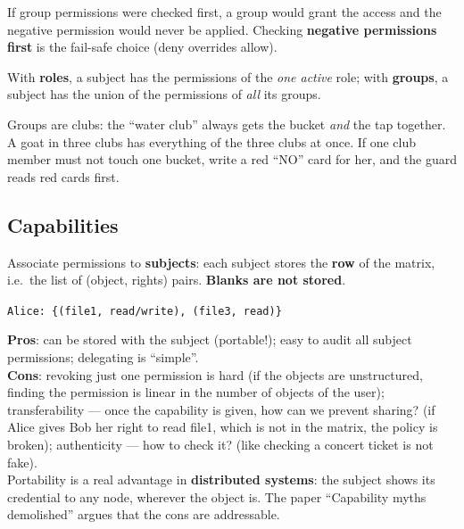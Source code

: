 \begin{propbox}[title=Negative permissions are checked first]
If group permissions were checked first, a group would grant the access and the
negative permission would never be applied. Checking \textbf{negative permissions first}
is the fail-safe choice (deny overrides allow).
\end{propbox}

\begin{rembox}[title=RBAC vs.\ groups]
With \textbf{roles}, a subject has the permissions of the \emph{one active} role; with
\textbf{groups}, a subject has the union of the permissions of \emph{all} its groups.
\end{rembox}

\begin{goatbox}
Groups are clubs: the ``water club'' always gets the bucket \emph{and} the tap together. A goat in
three clubs has everything of the three clubs at once. If one club member must not touch one
bucket, write a red ``NO'' card for her, and the guard reads red cards first.
\end{goatbox}

\subsection{Capabilities}

\begin{defnbox}[title=Capabilities]
Associate permissions to \textbf{subjects}: each subject stores the \textbf{row} of the
matrix, i.e.\ the list of (object, rights) pairs. \textbf{Blanks are not stored}.
\begin{center}
\texttt{Alice: \{(file1, read/write), (file3, read)\}}
\end{center}
\end{defnbox}

\begin{propbox}[title=Capabilities: pros and cons]
\textbf{Pros}: can be stored with the subject (portable!); easy to audit all subject
permissions; delegating is ``simple''. \\
\textbf{Cons}: revoking just one permission is hard (if the objects are unstructured, finding the permission
is linear in the number of objects of the user); transferability --- once the capability is given, how can we
prevent sharing? (if Alice gives Bob her right to read file1, which is not in the matrix, the
policy is broken); authenticity --- how to check it? (like checking a concert ticket is not
fake). \\
Portability is a real advantage in \textbf{distributed systems}: the subject shows its credential
to any node, wherever the object is. The paper ``Capability myths demolished'' argues that the
cons are addressable.
\end{propbox}

